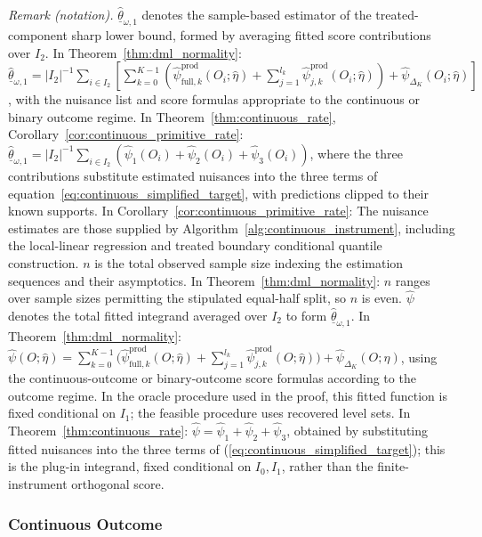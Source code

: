 \noindent\textit{Remark (notation).} $\hat{\underline\theta}_{\omega,1}$ denotes the sample-based estimator of the treated-component sharp lower bound, formed by averaging fitted score contributions over $I_2$. In Theorem~\ref{thm:dml_normality}: $\hat{\underline\theta}_{\omega,1}=|I_2|^{-1}\sum_{i\in I_2}\left[\sum_{k=0}^{K-1}\left(\hat\psi_{\text{full},k}^{\text{prod}}(O_i;\hat\eta)+\sum_{j=1}^{l_k}\hat\psi_{j,k}^{\text{prod}}(O_i;\hat\eta)\right)+\hat\psi_{\Delta_K}(O_i;\hat\eta)\right]$, with the nuisance list and score formulas appropriate to the continuous or binary outcome regime. In Theorem~\ref{thm:continuous_rate}, Corollary~\ref{cor:continuous_primitive_rate}: $\hat{\underline\theta}_{\omega,1}=|I_2|^{-1}\sum_{i\in I_2}(\hat\psi_1(O_i)+\hat\psi_2(O_i)+\hat\psi_3(O_i))$, where the three contributions substitute estimated nuisances into the three terms of equation~\ref{eq:continuous_simplified_target}, with predictions clipped to their known supports. In Corollary~\ref{cor:continuous_primitive_rate}: The nuisance estimates are those supplied by Algorithm~\ref{alg:continuous_instrument}, including the local-linear regression and treated boundary conditional quantile construction. $n$ is the total observed sample size indexing the estimation sequences and their asymptotics. In Theorem~\ref{thm:dml_normality}: $n$ ranges over sample sizes permitting the stipulated equal-half split, so $n$ is even. $\hat\psi$ denotes the total fitted integrand averaged over $I_2$ to form $\hat{\underline\theta}_{\omega,1}$. In Theorem~\ref{thm:dml_normality}: $\hat\psi(O;\hat\eta)=\sum_{k=0}^{K-1}\bigl(\hat\psi_{\mathrm{full},k}^{\mathrm{prod}}(O;\hat\eta)+\sum_{j=1}^{l_k}\hat\psi_{j,k}^{\mathrm{prod}}(O;\hat\eta)\bigr)+\hat\psi_{\Delta_K}(O;\hat\eta)$, using the continuous-outcome or binary-outcome score formulas according to the outcome regime. In the oracle procedure used in the proof, this fitted function is fixed conditional on $I_1$; the feasible procedure uses recovered level sets. In Theorem~\ref{thm:continuous_rate}: $\hat\psi=\hat\psi_1+\hat\psi_2+\hat\psi_3$, obtained by substituting fitted nuisances into the three terms of (\ref{eq:continuous_simplified_target}); this is the plug-in integrand, fixed conditional on $I_0,I_1$, rather than the finite-instrument orthogonal score.


\subsubsection{Continuous Outcome}\label{subsubsec:continuous_outcome}

